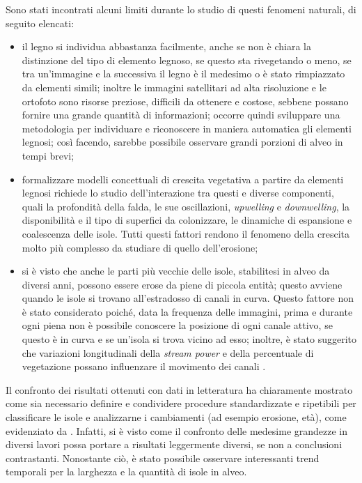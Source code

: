 Sono stati incontrati alcuni limiti durante lo studio di questi fenomeni naturali, di seguito elencati:
%
\begin{itemize}
	\item il legno si individua abbastanza facilmente, anche se non è chiara la distinzione del tipo di elemento legnoso, se questo sta rivegetando o meno, se tra un'immagine e la successiva il legno è il medesimo o è stato rimpiazzato da elementi simili;
	inoltre le immagini satellitari ad alta risoluzione e le ortofoto sono risorse preziose, difficili da ottenere e costose, sebbene possano fornire una grande quantità di informazioni;
	occorre quindi sviluppare una metodologia per individuare e riconoscere in maniera automatica gli elementi legnosi; così facendo, sarebbe possibile osservare grandi porzioni di alveo in tempi brevi;
	\item formalizzare modelli concettuali di crescita vegetativa a partire da elementi legnosi richiede lo studio dell'interazione tra questi e diverse componenti, quali la profondità della falda, le sue oscillazioni, \emph{upwelling} e \emph{downwelling}, la disponibilità e il tipo di superfici da colonizzare, le dinamiche di espansione e coalescenza delle isole.
	Tutti questi fattori rendono il fenomeno della crescita molto più complesso da studiare di quello dell'erosione;
	\item si è visto che anche le parti più vecchie delle isole, stabilitesi in alveo da diversi anni, possono essere erose da piene di piccola entità;
	questo avviene quando le isole si trovano all'estradosso di canali in curva.
	Questo fattore non è stato considerato poiché, data la frequenza delle immagini, prima e durante ogni piena non è possibile conoscere la posizione di ogni canale attivo, se questo è in curva e se un'isola si trova vicino ad esso;
	inoltre, è stato suggerito che variazioni longitudinali della \emph{stream power} e della percentuale di vegetazione possano influenzare il movimento dei canali .
\end{itemize}
%

Il confronto dei risultati ottenuti con dati in letteratura ha chiaramente mostrato come sia necessario definire e condividere procedure standardizzate e ripetibili per classificare le isole e analizzarne i cambiamenti (ad esempio erosione, età), come evidenziato da .
Infatti, si è visto come il confronto delle medesime grandezze in diversi lavori possa portare a risultati leggermente diversi, se non a conclusioni contrastanti.
Nonostante ciò, è stato possibile osservare interessanti trend temporali per la larghezza e la quantità di isole in alveo.

